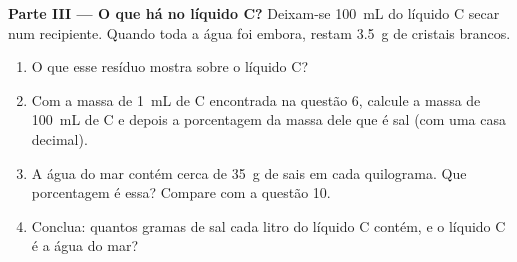 \begin{problem}
\medskip
\noindent\textbf{Parte III --- O que há no líquido C?}
Deixam-se \qty{100}{mL} do líquido C secar num recipiente. Quando toda a
água foi embora, restam \qty{3.5}{g} de cristais brancos.
\begin{enumerate}[resume]
  \item O que esse resíduo mostra sobre o líquido C?
  \item Com a massa de \qty{1}{mL} de C encontrada na questão 6, calcule
        a massa de \qty{100}{mL} de C e depois a porcentagem da massa
        dele que é sal (com uma casa decimal).
  \item A água do mar contém cerca de \qty{35}{g} de sais em cada
        quilograma. Que porcentagem é essa? Compare com a questão 10.
  \item Conclua: quantos gramas de sal cada litro do líquido C contém, e
        o líquido C é a água do mar?
\end{enumerate}
\end{problem}